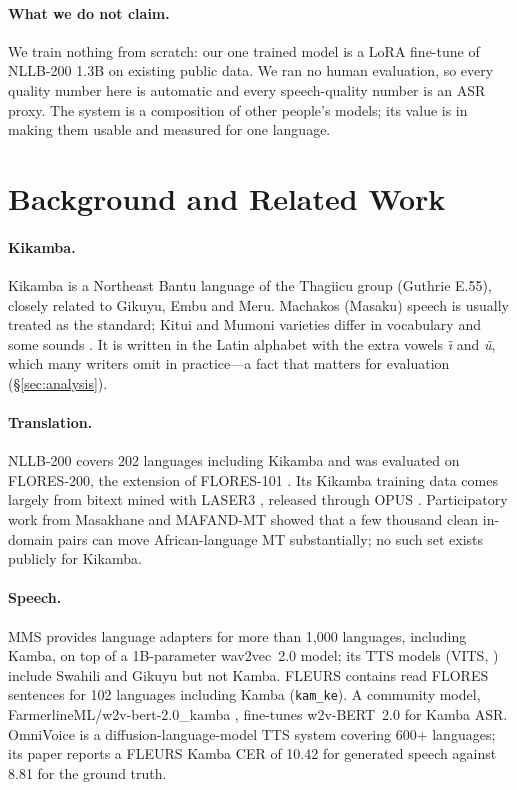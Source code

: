 \documentclass[11pt]{article}
\begin{document}
\paragraph{What we do not claim.} We train nothing from scratch: our one trained model is a LoRA fine-tune of NLLB-200 1.3B on existing public data. We ran no human evaluation, so every quality number here is automatic and every speech-quality number is an ASR proxy. The system is a composition of other people's models; its value is in making them usable and measured for one language.

\section{Background and Related Work}
\label{sec:related}

\paragraph{Kikamba.} Kikamba is a Northeast Bantu language of the Thagiicu group (Guthrie E.55), closely related to Gikuyu, Embu and Meru. Machakos (Masaku) speech is usually treated as the standard; Kitui and Mumoni varieties differ in vocabulary and some sounds \citep{whiteley1962kamba}. It is written in the Latin alphabet with the extra vowels \emph{\~{\i}} and \emph{\~{u}}, which many writers omit in practice---a fact that matters for evaluation (\S\ref{sec:analysis}).

\paragraph{Translation.} NLLB-200 \citep{nllb2022} covers 202 languages including Kikamba and was evaluated on FLORES-200, the extension of FLORES-101 \citep{goyal2022flores}. Its Kikamba training data comes largely from bitext mined with LASER3 \citep{heffernan2022laser3}, released through OPUS \citep{tiedemann2012opus}. Participatory work from Masakhane \citep{nekoto2020participatory} and MAFAND-MT \citep{adelani2022mafand} showed that a few thousand clean in-domain pairs can move African-language MT substantially; no such set exists publicly for Kikamba.

\paragraph{Speech.} MMS \citep{pratap2024mms} provides language adapters for more than 1,000 languages, including Kamba, on top of a 1B-parameter wav2vec~2.0 model; its TTS models (VITS, \citealp{kim2021vits}) include Swahili and Gikuyu but not Kamba. FLEURS \citep{conneau2023fleurs} contains read FLORES sentences for 102 languages including Kamba (\texttt{kam\_ke}). A community model, FarmerlineML/w2v-bert-2.0\_kamba \citep{farmerline2025kamba}, fine-tunes w2v-BERT~2.0 \citep{seamless2023m4t} for Kamba ASR. OmniVoice \citep{zhu2026omnivoice} is a diffusion-language-model TTS system covering 600+ languages; its paper reports a FLEURS Kamba CER of 10.42 for generated speech against 8.81 for the ground truth.
\end{document}
